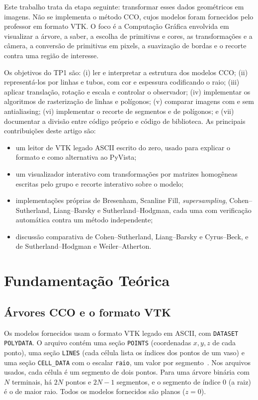 \documentclass[11pt, a4paper]{article}
\begin{document}
Este trabalho trata da etapa seguinte: transformar esses dados geométricos em imagens. Não se implementa o método CCO, cujos modelos foram fornecidos pelo professor em formato VTK. O foco é a Computação Gráfica envolvida em visualizar a árvore, a saber, a escolha de primitivas e cores, as transformações e a câmera, a conversão de primitivas em pixels, a suavização de bordas e o recorte contra uma região de interesse.

Os objetivos do TP1 são: (i) ler e interpretar a estrutura dos modelos CCO; (ii) representá-los por linhas e tubos, com cor e espessura codificando o raio; (iii) aplicar translação, rotação e escala e controlar o observador; (iv) implementar os algoritmos de rasterização de linhas e polígonos; (v) comparar imagens com e sem antialiasing; (vi) implementar o recorte de segmentos e de polígonos; e (vii) documentar a divisão entre código próprio e código de biblioteca. As principais contribuições deste artigo são:
\begin{itemize}[leftmargin=*]
  \item um leitor de VTK legado ASCII escrito do zero, usado para explicar o formato e como alternativa ao PyVista;
  \item um visualizador interativo com transformações por matrizes homogêneas escritas pelo grupo e recorte interativo sobre o modelo;
  \item implementações próprias de Bresenham, Scanline Fill, \emph{supersampling}, Cohen--Sutherland, Liang--Barsky e Sutherland--Hodgman, cada uma com verificação automática contra um método independente;
  \item discussão comparativa de Cohen--Sutherland, Liang--Barsky e Cyrus--Beck, e de Sutherland--Hodgman e Weiler--Atherton.
\end{itemize}

\section{Fundamentação Teórica}

\subsection{Árvores CCO e o formato VTK}
Os modelos fornecidos usam o formato VTK legado em ASCII, com \texttt{DATASET POLYDATA}. O arquivo contém uma seção \texttt{POINTS} (coordenadas $x,y,z$ de cada ponto), uma seção \texttt{LINES} (cada célula lista os índices dos pontos de um vaso) e uma seção \texttt{CELL\_DATA} com o escalar \texttt{raio}, um valor por segmento~\cite{schroeder2006}. Nos arquivos usados, cada célula é um segmento de dois pontos. Para uma árvore binária com $N$ terminais, há $2N$ pontos e $2N-1$ segmentos, e o segmento de índice 0 (a raiz) é o de maior raio. Todos os modelos fornecidos são planos ($z=0$).
\end{document}

